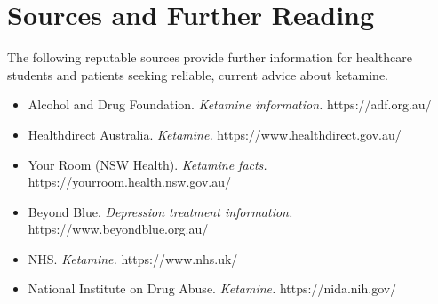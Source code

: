 \section*{Sources and Further Reading}
The following reputable sources provide further information for healthcare students and patients seeking reliable, current advice about ketamine.
\begin{itemize}
    \item Alcohol and Drug Foundation. \textit{Ketamine information.} https://adf.org.au/
    \item Healthdirect Australia. \textit{Ketamine.} https://www.healthdirect.gov.au/
    \item Your Room (NSW Health). \textit{Ketamine facts.} https://yourroom.health.nsw.gov.au/
    \item Beyond Blue. \textit{Depression treatment information.} https://www.beyondblue.org.au/
    \item NHS. \textit{Ketamine.} https://www.nhs.uk/
    \item National Institute on Drug Abuse. \textit{Ketamine.} https://nida.nih.gov/
\end{itemize}
